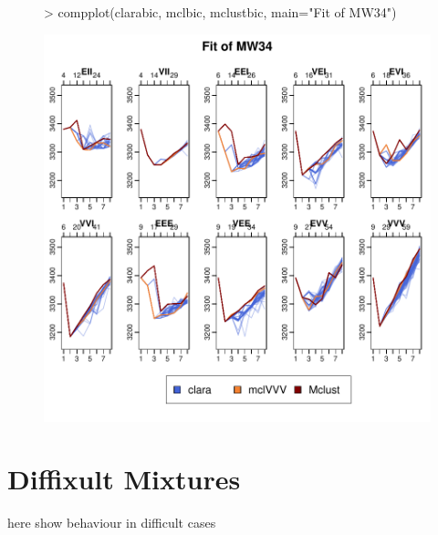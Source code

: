 \begin{figure}[h]
\begin{Schunk}
\begin{Sinput}
>     compplot(clarabic, mclbic, mclustbic, main="Fit of MW34")
\end{Sinput}
\end{Schunk}
\includegraphics{chapter3-figMW34bic}
\end{figure}

\section{Diffixult Mixtures}

here show behaviour in difficult cases

